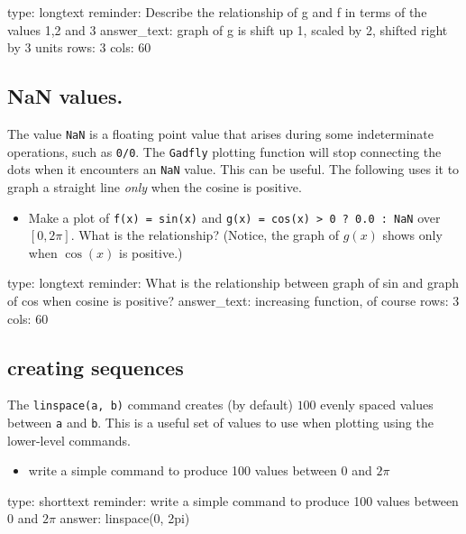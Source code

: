 \documentclass[12pt]{article}
\begin{document}
\begin{answer}
type: longtext
reminder: Describe the relationship of g and f in terms of the values 1,2 and 3
answer_text: graph of g is shift up 1, scaled by 2, shifted right by 3 units 
rows: 3
cols: 60
\end{answer}

\subsection{NaN values.}

The value \texttt{NaN} is a floating point value that arises during some
indeterminate operations, such as \texttt{0/0}. The \texttt{Gadfly}
plotting function will stop connecting the dots when it encounters an
\texttt{NaN} value. This can be useful. The following uses it to graph a
straight line \emph{only} when the cosine is positive.

\begin{itemize}
\itemsep1pt\parskip0pt
\item
  Make a plot of \texttt{f(x) = sin(x)} and
  \texttt{g(x) = cos(x) \textgreater{} 0 ? 0.0 : NaN} over $[0, 2\pi]$.
  What is the relationship? (Notice, the graph of $g(x)$ shows only when
  $\cos(x)$ is positive.)
\end{itemize}

\begin{answer}
type: longtext
reminder: What is the relationship between graph of sin and graph of cos when cosine is positive?
answer_text: increasing function, of course 
rows: 3
cols: 60
\end{answer}

\subsection{creating sequences}

The \texttt{linspace(a, b)} command creates (by default) $100$ evenly
spaced values between \texttt{a} and \texttt{b}. This is a useful set of
values to use when plotting using the lower-level commands.

\begin{itemize}
\itemsep1pt\parskip0pt
\item
  write a simple command to produce 100 values between $0$ and $2\pi$
\end{itemize}

\begin{answer}
type: shorttext
reminder: write a simple command to produce  100 values between 0 and \(2\pi\)
answer: linspace(0, 2pi)

\end{answer}
\end{document}
